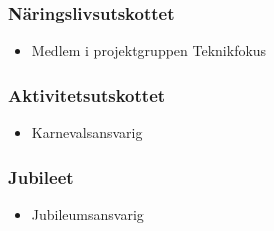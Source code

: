\documentclass{dsekprotokoll}
\begin{document}
\begin{multicols}{2}
    \subsubsection*{Näringslivsutskottet}
    \begin{itemize}
        \item Medlem i projektgruppen Teknikfokus
    \end{itemize}

    \subsubsection*{Aktivitetsutskottet}
    \begin{itemize}
        \item Karnevalsansvarig
    \end{itemize}

    \subsubsection*{Jubileet}
    \begin{itemize}
        \item Jubileumsansvarig
    \end{itemize}

\end{multicols}
\end{document}

